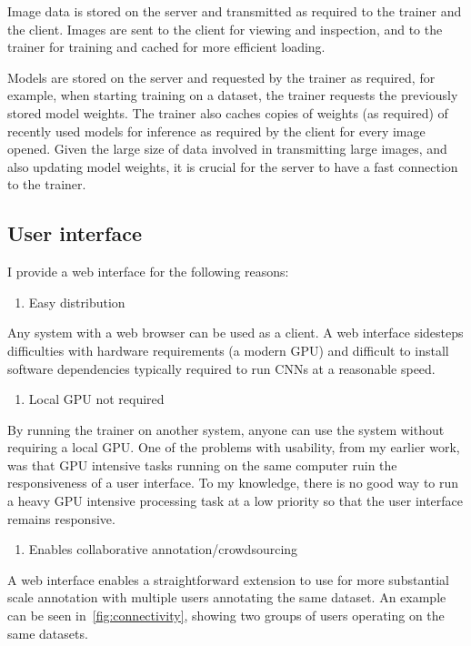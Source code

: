 Image data is stored on the server and transmitted as required to the trainer and the client. Images are sent to the client for viewing and inspection, and to the trainer for training and cached for more efficient loading. 

Models are stored on the server and requested by the trainer as required, for example, when starting training on a dataset, the trainer requests the previously stored model weights. The trainer also caches copies of weights (as required) of recently used models for inference as required by the client for every image opened. Given the large size of data involved in transmitting large images, and also updating model weights, it is crucial for the server to have a fast connection to the trainer.

\subsection {User interface}

I provide a web interface for the following reasons:

\begin{enumerate}
    \item Easy distribution
\end{enumerate}
Any system with a web browser can be used as a client. A web interface sidesteps difficulties with hardware requirements (a modern \gls{GPU}) and difficult to install software dependencies typically required to run \gls{CNN}s at a reasonable speed.
\begin{enumerate}[resume]
    \item Local GPU not required
\end{enumerate}
By running the trainer on another system, anyone can use the system without requiring a local GPU. One of the problems with usability, from my earlier work, was that GPU intensive tasks running on the same computer ruin the responsiveness of a user interface. To my knowledge, there is no good way to run a heavy \gls{GPU} intensive processing task at a low priority so that the user interface remains responsive.
\begin{enumerate}[resume]
    \item Enables collaborative annotation/crowdsourcing
\end{enumerate}
A web interface enables a straightforward extension to use for more substantial scale annotation with multiple users annotating the same dataset. An example can be seen in~\ref{fig:connectivity}, showing two groups of users operating on the same datasets.


